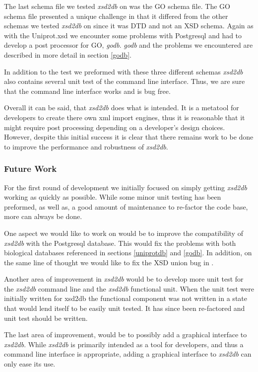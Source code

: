 The last schema file we tested \emph{xsd2db} on was the GO schema file.  The GO schema file presented a unique challenge in that it differed from the other schemas we tested \emph{xsd2db} on since it was DTD and not an XSD schema.  Again as with the Uniprot.xsd we encounter some problems with Postgresql and had to develop a post processor for GO, \emph{godb}.  \emph{godb} and the problems we encountered are described in more detail in section \ref{godb}.

In addition to the test we preformed with these three different schemas \emph{xsd2db} also contains several unit test of the command line interface.  Thus, we are sure that the command line interface works and is bug free.

Overall it can be said, that \emph{xsd2db} does what is intended.  It is a metatool for developers to create there own xml import engines, thus it is reasonable that it might require post processing depending on a developer's design choices.  However, despite this initial success it is clear that there remains work to be done to improve the performance and robustness of \emph{xsd2db}. 

\subsubsection{Future Work}
For the first round of development we initially focused on simply getting \emph{xsd2db} working as quickly as possible.  While some minor unit testing has been preformed, as well as, a good amount of maintenance to re-factor the code base, more can always be done.  

One aspect we would like to work on would be to improve the compatibility of \emph{xsd2db} with the Postgresql database.  This would fix  the problems with both biological databases referenced in sections \ref{uniprotdb} and \ref{godb}.  In addition, on the same line of thought we would like to fix the XSD union bug in .

Another area of improvement in \emph{xsd2db} would be to develop more unit test for the \emph{xsd2db} command line and the \emph{xsd2db} functional unit.  When the unit test were initially written for xsd2db the functional component was not written in a state that would lend itself to be easily unit tested.  It has since been re-factored and unit test should be written.

The last area of improvement, would be to possibly add a graphical interface to \emph{xsd2db}.  While \emph{xsd2db} is primarily intended as a tool for developers, and thus a command line interface is appropriate, adding a graphical interface to \emph{xsd2db} can only ease its use.



